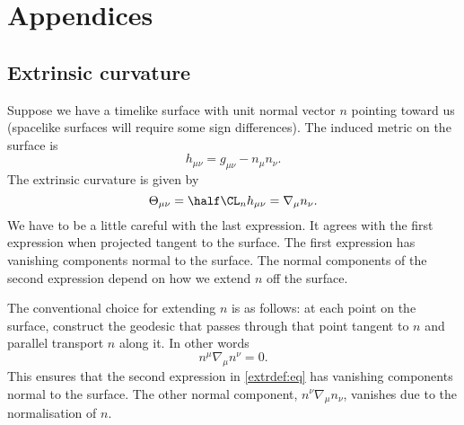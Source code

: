 \section*{Appendices}
\begin{subappendices}

\section{Extrinsic curvature}\label{sec:extrinsic}

Suppose we have a timelike surface with unit normal vector $n$ pointing toward us (spacelike surfaces will require some sign differences). The induced metric on the surface is
%
\begin{equation}\label{indmet:eq}
  h_{\mu\nu} = g_{\mu\nu} - n_\mu n_\nu.
\end{equation}
%
The extrinsic curvature is given by \cite{Wald-GeneRela:84}
%
\begin{equation}\label{extrdef:eq}
  \Theta_{\mu\nu} = \half \CL_n h_{\mu\nu} = \nabla_\mu n_\nu.
\end{equation}
%
We have to be a little careful with the last expression. It agrees with the first expression when projected tangent to the surface. The first expression has vanishing components normal to the surface. The normal components of the second expression depend on how we extend $n$ off the surface.

The conventional choice for extending $n$ is as follows: at each point on the surface, construct the geodesic that passes through that point tangent to $n$ and parallel transport $n$ along it. In other words
%
\begin{equation}\label{geodesic:eq}
  n^\mu \nabla_\mu n^\nu = 0.
\end{equation}
%
This ensures that the second expression in \eqref{extrdef:eq} has vanishing components normal to the surface. The other normal component, $n^\nu \nabla_\mu n_\nu$, vanishes due to the normalisation of $n$.


\end{subappendices}
